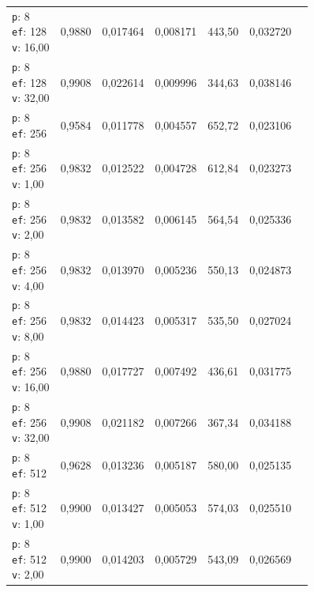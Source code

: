 \begin{table}[htbp]
\begin{tabularx}{\textwidth}{Xrrrrrr}
    \makecell{\texttt{p}: 8\\\texttt{ef}: 128\\\texttt{v}: 16,00} & 0,9880 & 0,017464 & 0,008171 & 443,50 & 0,032720 \\
    \makecell{\texttt{p}: 8\\\texttt{ef}: 128\\\texttt{v}: 32,00} & 0,9908 & 0,022614 & 0,009996 & 344,63 & 0,038146 \\
    \makecell{\texttt{p}: 8\\\texttt{ef}: 256} & 0,9584 & 0,011778 & 0,004557 & 652,72 & 0,023106 \\
    \makecell{\texttt{p}: 8\\\texttt{ef}: 256\\\texttt{v}: 1,00} & 0,9832 & 0,012522 & 0,004728 & 612,84 & 0,023273 \\
    \makecell{\texttt{p}: 8\\\texttt{ef}: 256\\\texttt{v}: 2,00} & 0,9832 & 0,013582 & 0,006145 & 564,54 & 0,025336 \\
    \makecell{\texttt{p}: 8\\\texttt{ef}: 256\\\texttt{v}: 4,00} & 0,9832 & 0,013970 & 0,005236 & 550,13 & 0,024873 \\
    \makecell{\texttt{p}: 8\\\texttt{ef}: 256\\\texttt{v}: 8,00} & 0,9832 & 0,014423 & 0,005317 & 535,50 & 0,027024 \\
    \makecell{\texttt{p}: 8\\\texttt{ef}: 256\\\texttt{v}: 16,00} & 0,9880 & 0,017727 & 0,007492 & 436,61 & 0,031775 \\
    \makecell{\texttt{p}: 8\\\texttt{ef}: 256\\\texttt{v}: 32,00} & 0,9908 & 0,021182 & 0,007266 & 367,34 & 0,034188 \\
    \makecell{\texttt{p}: 8\\\texttt{ef}: 512} & 0,9628 & 0,013236 & 0,005187 & 580,00 & 0,025135 \\
    \makecell{\texttt{p}: 8\\\texttt{ef}: 512\\\texttt{v}: 1,00} & 0,9900 & 0,013427 & 0,005053 & 574,03 & 0,025510 \\
    \makecell{\texttt{p}: 8\\\texttt{ef}: 512\\\texttt{v}: 2,00} & 0,9900 & 0,014203 & 0,005729 & 543,09 & 0,026569 \\

\end{tabularx}
\end{table}

